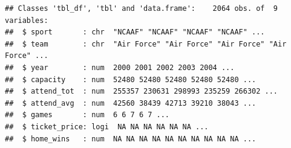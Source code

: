 \documentclass[man]{apa6}
\newenvironment{Shaded}{\begin{snugshade}}{\end{snugshade}}
\newcommand{\DataTypeTok}[1]{\textcolor[rgb]{0.13,0.29,0.53}{#1}}
\newcommand{\KeywordTok}[1]{\textcolor[rgb]{0.13,0.29,0.53}{\textbf{#1}}}
\newcommand{\NormalTok}[1]{#1}
\newcommand{\OperatorTok}[1]{\textcolor[rgb]{0.81,0.36,0.00}{\textbf{#1}}}
\newcommand{\StringTok}[1]{\textcolor[rgb]{0.31,0.60,0.02}{#1}}
\begin{document}
\begin{Shaded}
\end{Shaded}

\begin{verbatim}
## Classes 'tbl_df', 'tbl' and 'data.frame':    2064 obs. of  9 variables:
##  $ sport       : chr  "NCAAF" "NCAAF" "NCAAF" "NCAAF" ...
##  $ team        : chr  "Air Force" "Air Force" "Air Force" "Air Force" ...
##  $ year        : num  2000 2001 2002 2003 2004 ...
##  $ capacity    : num  52480 52480 52480 52480 52480 ...
##  $ attend_tot  : num  255357 230631 298993 235259 266302 ...
##  $ attend_avg  : num  42560 38439 42713 39210 38043 ...
##  $ games       : num  6 6 7 6 7 ...
##  $ ticket_price: logi  NA NA NA NA NA NA ...
##  $ home_wins   : num  NA NA NA NA NA NA NA NA NA NA ...
\end{verbatim}

\begin{Shaded}
\end{Shaded}
\end{document}
